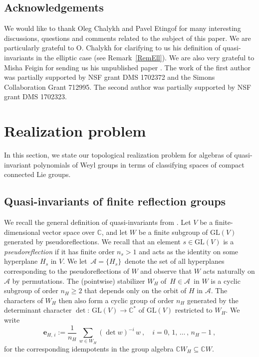 \documentclass[11pt]{amsart}
\theoremstyle{definition}
\theoremstyle{remark}
\numberwithin{equation}{section}
\newcommand{\la}{\label}
\newcommand{\GL}{\mathrm{GL}}
\def\C{\mathbb C}
\def\e{\boldsymbol{e}}
\def\A{\mathcal{A}}
\begin{document}
\subsection*{Acknowledgements}
We would like to thank Oleg Chalykh and Pavel Etingof  for many interesting discussions, 
questions and comments related to the subject of this paper. We are particularly grateful to O. Chalykh for clarifying to us his definition of quasi-invariants in the elliptic case (see Remark~\ref{RemEll}). We are also very grateful to Misha Feigin for sending us his unpublished paper \cite{FF}. 
The work of the first author was partially supported by NSF grant DMS 1702372 and the Simons Collaboration Grant 712995. The second author was partially supported by NSF grant DMS 1702323. 

\section{Realization problem}
\la{S2}
%
In this section, we state our topological realization problem for algebras of quasi-invariant polynomials of Weyl groups in terms of classifying spaces of compact connected Lie groups. 

\subsection{Quasi-invariants of finite reflection groups}
\la{S2.1}
We recall the general definition of quasi-invariants from \cite{BC11}. Let $V$ be a finite-dimensional vector space over $\C$, and let $W$ be a finite subgroup of $\GL(V)$ generated by pseudoreflections. We recall that an element $ s \in \GL(V) $ is a {\it pseudoreflection} if it has finite order $ n_s > 1 $ and acts as the identity on some hyperplane $ H_s $ in $V$. We let $\, \A =\{H_s\}\,$ denote the set of all hyperplanes corresponding to the pseudoreflections of $ W $ and observe that  $ W $ acts naturally on $ \A $ by permutations. The (pointwise) stabilizer $W_H$ of $\, H \in \A \,$ in $W$ is a cyclic subgroup of order $ n_H \ge 2$ that depends only on the orbit of $H$ in $\A $. The characters of $W_H$ then also form a cyclic group of order $n_H$ generated by the determinant character 
$ \det: \, \GL(V) \to \C^* $ of $ \GL(V) $ restricted to $W_H$. We write
%
$$
\e_{H,\, i} := \frac{1}{n_H}\,\sum_{w \in W_H} (\det w)^{-i} \, w \ , \quad
i = 0,\,1,\,\ldots\,,\,n_H -1\ ,
$$
%
for the corresponding idempotents in the group algebra $ \C W_H  \subseteq \C W$. 
\end{document}
